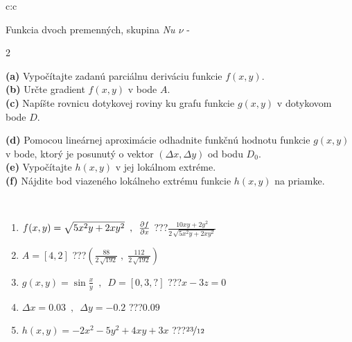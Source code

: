 \documentclass[10pt]{report}
\begin{document}
\begin{tabular}{c:c}
\begin{minipage}[c][104.5mm][t]{0.5\linewidth}
\begin{center}
\vspace{7mm}
{\huge \LARGE Funkcia dvoch premenných, skupina \textit{Nu $\nu$} -}\\[5mm]
\begin{minipage}{0.95\linewidth}
\begin{center}
{\small \begin{multicols}{2} \raggedright
\textbf{(a)} Vypočítajte zadanú parciálnu deriváciu funkcie \(f(x,y)\). \\[1mm]
\textbf{(b)} Určte gradient \(f(x,y)\) v bode \(A\). \\[1mm]
\textbf{(c)} Napíšte rovnicu dotykovej roviny ku grafu funkcie \(g(x,y)\) v dotykovom bode \(D\). \par \columnbreak
\textbf{(d)} Pomocou lineárnej aproximácie odhadnite funkčnú hodnotu funkcie \(g(x,y)\) v bode, ktorý je posunutý o vektor \((\Delta x, \Delta y)\) od bodu \(D_0\). \\[1mm]
\textbf{(e)} Vypočítajte \(h(x,y)\) v jej lokálnom extréme. \\[1mm]
\textbf{(f)} Nájdite bod viazeného lokálneho extrému funkcie \(h(x,y)\) na priamke. \\[1mm]
\end{multicols}
}
\end{center}
\end{minipage}
\\[4mm]
\begin{minipage}{0.79\linewidth}
\begin{center}
\begin{varwidth}{\linewidth}
\begin{enumerate}
\normalsizerr
\item $f(x,y) = \sqrt{5x^2y + 2xy^2}\enspace , \enspace \pdv{f}{x}$\quad \dotfill\; ???\;\dotfill \quad $\frac{10xy+2y^2}{2\,\sqrt{5x^2y+2xy^2}}$
\item $A = [4, 2]$\quad \dotfill\; ???\;\dotfill \quad $\left( \frac{88}{2\,\sqrt{192}} \;,\; \frac{112}{2\,\sqrt{192}} \right)$
\item $g(x,y) = \sin\frac{x}{y} \enspace , \enspace D = [0, 3, ?]$\quad \dotfill\; ???\;\dotfill \quad $x-3z=0$
\item $\Delta x = {0.03} \enspace,\enspace \Delta y = {-0.2}$\quad \dotfill\; ???\;\dotfill \quad $0.09$
\item $h(x,y) = -2x^2-5y^2+4xy+3x$\quad \dotfill\; ???\;\dotfill \quad $\nicefrac{23}{12}$

\end{enumerate}
\end{varwidth}
\end{center}
\end{minipage}
\end{center}
\end{minipage}
\end{tabular}
\end{document}
